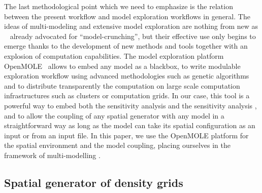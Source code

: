 \documentclass[preprint,5p,times,twocolumn,authoryear]{elsarticle}
\begin{document}
The last methodological point which we need to emphasize is the relation between the present workflow and model exploration workflows in general. The ideas of multi-modeling and extensive model exploration are nothing from new as ~\cite{openshaw1983data} already advocated for ``model-crunching'', but their effective use only begins to emerge thanks to the development of new methods and tools together with an explosion of computation capabilities. The model exploration platform OpenMOLE~\citep{reuillon2013openmole} allows to embed any model as a blackbox, to write modulable exploration workflow using advanced methodologies such as genetic algorithms and to distribute transparently the computation on large scale computation infrastructures such as clusters or computation grids. In our case, this tool is a powerful way to embed both the sensitivity analysis and the sensitivity analysis , and to allow the coupling of any spatial generator with any model in a straightforward way as long as the model can take its spatial configuration as an input or from an input file. In this paper, we use the OpenMOLE platform for the spatial environment and the model coupling, placing ourselves in the  framework of multi-modelling \citep{cottineau2015modular}. 


\subsection{Spatial generator of density grids}
\end{document}
